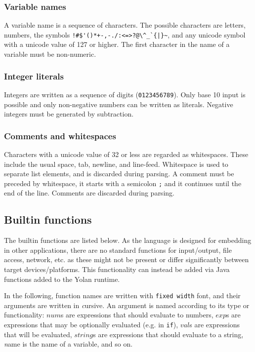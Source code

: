 \documentclass[11pt]{report}
\begin{document}
\subsubsection{Variable names}
A variable name is a sequence of characters. The possible characters are letters, numbers, the symbols \verb"!#$'()*+-,-./:<=>?@\^_`{|}~", and any unicode symbol with a unicode value of 127 or higher. The first character in the name of a variable must be non-numeric.

\subsubsection{Integer literals}

Integers are written as a sequence of digits (\verb|0123456789|). Only base 10 input is possible and only non-negative numbers can be written as literals. Negative integers must be generated by subtraction.

\subsubsection{Comments and whitespaces}
Characters with a unicode value of 32 or less are regarded as whitespaces. These include the usual space, tab, newline, and line-feed. Whitespace is used to separate list elements, and is discarded during parsing. A comment must be preceded by whitespace, it starts with a semicolon \verb|;| and it continues until the end of the line. Comments are discarded during parsing.

\subsection{Builtin functions}
The builtin functions are listed below. As the language is designed for embedding in other applications, there are no standard functions for input/output, file access, network, etc. as these might not be present or differ significantly between target devices/platforms. 
This functionality can instead be added via Java functions added to the Yolan runtime.

In the following, function names are written with {\tt fixed width} font, and their arguments are written in {\textit cursive}. An argument is named according to its type or functionality: $num$s are expressions that should evaluate to numbers, $exp$s are expressions that may be optionally evaluated (e.g. in {\tt if}), $val$s are expressions that will be evaluated, $string$s are expressions that should evaluate to a string, {\textit name} is the name of a variable, and so on.
\end{document}
